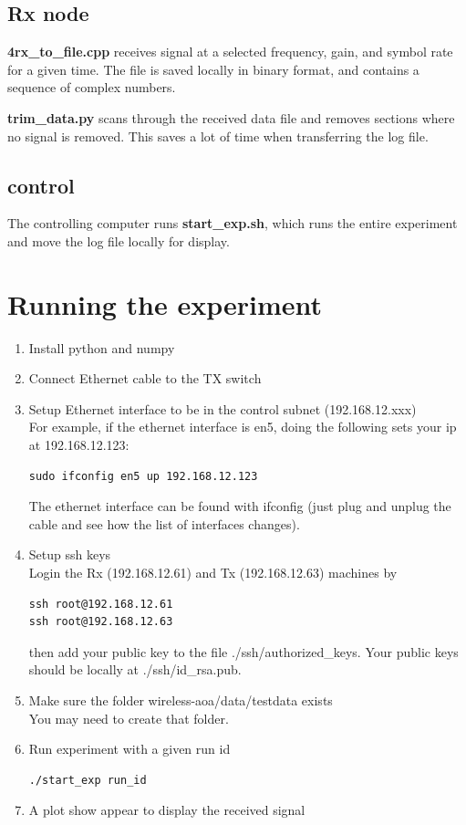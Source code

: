 \documentclass[10pt]{article}
\begin{document}
\subsection{Rx node}
\textbf{4rx\_to\_file.cpp} receives signal at a selected frequency, gain, and symbol rate for a given time.  The file is saved locally in binary format, and contains a sequence of complex numbers.

\textbf{trim\_data.py} scans through the received data file and removes sections where no signal is removed.  This saves a lot of time when transferring the log file.

\subsection{control}
The controlling computer runs \textbf{start\_exp.sh}, which runs the entire experiment and move the log file locally for display.


\section{Running the experiment}

\begin{enumerate}
\item Install python and numpy
\item Connect Ethernet cable to the TX switch
\item Setup Ethernet interface to be in the control subnet (192.168.12.xxx)\\
For example, if the ethernet interface is en5, doing the following sets your ip at 192.168.12.123:
\begin{lstlisting}
sudo ifconfig en5 up 192.168.12.123
\end{lstlisting}
The ethernet interface can be found with ifconfig (just plug and unplug the cable and see how the list of interfaces changes).
\item Setup ssh keys\\
Login the Rx (192.168.12.61) and Tx (192.168.12.63) machines by
\begin{lstlisting}
ssh root@192.168.12.61 
ssh root@192.168.12.63
\end{lstlisting}
then add your public key to the file ./ssh/authorized\_keys.  Your public keys should be locally at ./ssh/id\_rsa.pub.
\item Make sure the folder wireless-aoa/data/testdata exists\\
You may need to create that folder.
\item Run experiment with a given run id
\begin{lstlisting}
./start_exp run_id
\end{lstlisting}
\item A plot show appear to display the received signal

\end{enumerate}

\end{document}
